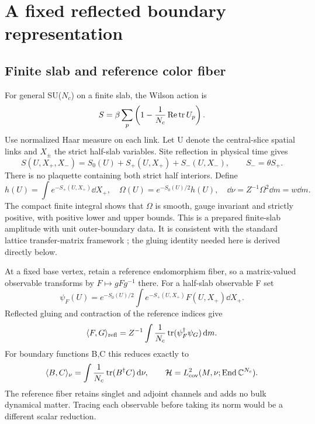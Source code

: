 \section{A fixed reflected boundary representation}\label{sec:boundary}
\subsection{Finite slab and reference color fiber}
For general SU($N_c$) on a finite slab, the Wilson action \cite{wilson} is
\begin{equation}
S=\beta\sum_p\left(1-\frac1{N_c}\operatorname{Re}\operatorname{tr} U_p\right).
\end{equation}
Use normalized Haar measure on each link. Let U denote the central-slice
spatial links and $X_\pm$ the strict half-slab variables. Site reflection
in physical time gives
\begin{equation}
S(U,X_+,X_-)=S_0(U)+S_+(U,X_+)+S_-(U,X_-),
\qquad S_-=\theta S_+.
\end{equation}
There is no plaquette containing both strict half interiors. Define
\begin{equation}\label{eq:boundary-weight}
h(U)=\int e^{-S_+(U,X_+)}\dd X_+,
\quad \Omega(U)=e^{-S_0(U)/2}h(U),
\quad \dd\nu=Z^{-1}\Omega^2\dd m=w\dd m.
\end{equation}
The compact finite integral shows that $\Omega$ is smooth, gauge
invariant and strictly positive, with positive lower and upper bounds.
This is a prepared finite-slab amplitude with unit outer-boundary data.
It is consistent with the standard lattice transfer-matrix framework
\cite{luscher}; the gluing identity needed here is derived directly below.

At a fixed base vertex, retain a reference endomorphism fiber, so a
matrix-valued observable transforms by $F\mapsto gFg^{-1}$ there.
For a half-slab observable F set
\begin{equation}
\psi_F(U)=e^{-S_0(U)/2}\int e^{-S_+(U,X_+)}F(U,X_+)\dd X_+.
\end{equation}
Reflected gluing and contraction of the reference indices give
\begin{equation}\label{eq:gluing}
\langle F,G\rangle_{\rm refl}=Z^{-1}\int\frac1{N_c}
             \operatorname{tr}(\psi_F^\dagger\psi_G)\,\mathrm d m.
\end{equation}
For boundary functions B,C this reduces exactly to
\begin{equation}\label{eq:physical-H}
\langle B,C\rangle_\nu=\int\frac1{N_c}\operatorname{tr}(B^\dagger C)\,\mathrm d\nu,
\qquad\mathcal H=L^2_{\rm cov}(M,\nu;\operatorname{End}\mathbb C^{N_c}).
\end{equation}
The reference fiber retains singlet and adjoint channels and adds no
bulk dynamical matter. Tracing each observable before taking its norm
would be a different scalar reduction.

